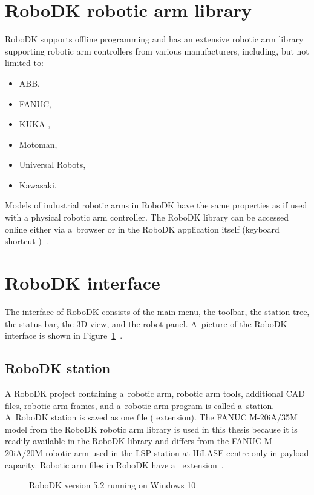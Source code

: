 \section{RoboDK robotic arm library}

RoboDK supports offline programming and has an extensive robotic arm library supporting robotic arm controllers from various manufacturers, including, but not limited to:

\begin{itemize}
    \item ABB, 
    \item FANUC, 
    \item KUKA ,
    \item Motoman, 
    \item Universal Robots,
    \item Kawasaki.
\end{itemize}
Models of industrial robotic arms in RoboDK have the same properties as if used with a physical robotic arm controller. The RoboDK library can be accessed online either via a~browser or in the RoboDK application itself (keyboard shortcut )~\cite{robodklibrary}.


\section{RoboDK interface}

The interface of RoboDK consists of the main menu, the toolbar, the station tree, the status bar, the 3D view, and the robot panel. A~picture of the RoboDK interface is shown in Figure~\ref{fig:robodkinterface}~\cite{robodkinterface}.

\subsection{RoboDK station}

A RoboDK project containing a~robotic arm, robotic arm tools, additional CAD files, robotic arm frames, and a~robotic arm program is called a~station. A~RoboDK station is saved as one file ( extension).  The FANUC M-20iA/35M model from the RoboDK robotic arm library is used in this thesis because it is readily available in the RoboDK library and differs from the FANUC M-20iA/20M robotic arm used in the LSP station at HiLASE centre only in payload capacity. Robotic arm files in RoboDK have a~ extension~\cite{robodkstation}.

\begin{figure}[h]
    \centering
    \noindent{}
    \caption{RoboDK version 5.2 running on Windows 10}
    \label{fig:robodkinterface}
\end{figure}

